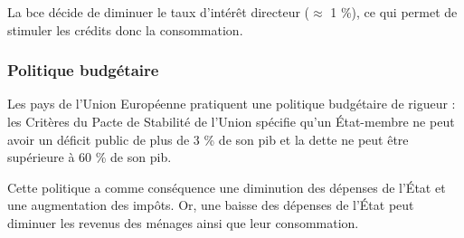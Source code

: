 \documentclass[10pt,a4paper,french]{article}
\begin{document}
La \gls{bce} décide de diminuer le taux d’intérêt directeur ($\approx$ 1 \%), ce qui permet de stimuler les crédits donc la consommation.

\subsubsection{Politique budgétaire}
Les pays de l’Union Européenne pratiquent une politique budgétaire de rigueur : les Critères du Pacte de Stabilité de l’Union spécifie qu’un État-membre ne peut avoir un déficit public de plus de 3 \% de son \gls{pib} et la dette ne peut être supérieure à 60 \% de son \gls{pib}.

Cette politique a comme conséquence une diminution des dépenses de l’État et une augmentation des impôts. Or, une baisse des dépenses de l’État peut diminuer les revenus des ménages ainsi que leur consommation.

\appendix %

\printindex
\printglossaries
\end{document}
